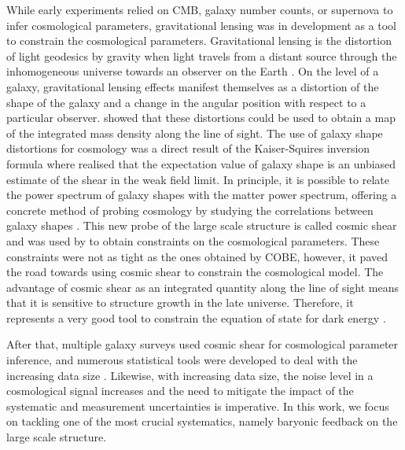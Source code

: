 While early experiments relied on CMB, galaxy number counts, or supernova to infer cosmological parameters, gravitational lensing was in development as a tool to constrain the cosmological parameters. Gravitational lensing is the distortion of light geodesics by gravity when light travels from a distant source through the inhomogeneous universe towards an observer on the Earth \citep{Schneider_Ehlers_Falco}. On the level of a galaxy, gravitational lensing effects manifest themselves as a distortion of the shape of the galaxy and a change in the angular position with respect to a particular observer. \citet{Kaiser_Squires_1993} showed that these distortions could be used to obtain a map of the integrated mass density along the line of sight. The use of galaxy shape distortions for cosmology was a direct result of the Kaiser-Squires inversion formula where \citet{seitz1996steps} realised that the expectation value of galaxy shape is an unbiased estimate of the shear in the weak field limit. In principle, it is possible to relate the power spectrum of galaxy shapes with the matter power spectrum, offering a concrete method of probing cosmology by studying the correlations between galaxy shapes \citep{Bartelmann_Schneider_2001}. This new probe of the large scale structure is called cosmic shear and was used by \citet{Maoli_VanWaerbeke_2001} to obtain constraints on the cosmological parameters. These constraints were not as tight as the ones obtained by COBE, however, it paved the road towards using cosmic shear to constrain the cosmological model. The advantage of cosmic shear as an integrated quantity along the line of sight means that it is sensitive to structure growth in the late universe. Therefore, it represents a very good tool to constrain the equation of state for dark energy \citep{Hu_Tegmark_1999, Jain_Taylor_2003}.

After that, multiple galaxy surveys used cosmic shear for cosmological parameter inference, and numerous statistical tools were developed to deal with the increasing data size \citep{Schneider_VanWaerbeke_Jain_Kruse_1998, Schneider_Eifler_Krause_2010}. Likewise, with increasing data size, the noise level in a cosmological signal increases and the need to mitigate the impact of the systematic and measurement uncertainties is imperative. In this work, we focus on tackling one of the most crucial systematics, namely baryonic feedback on the large scale structure.

